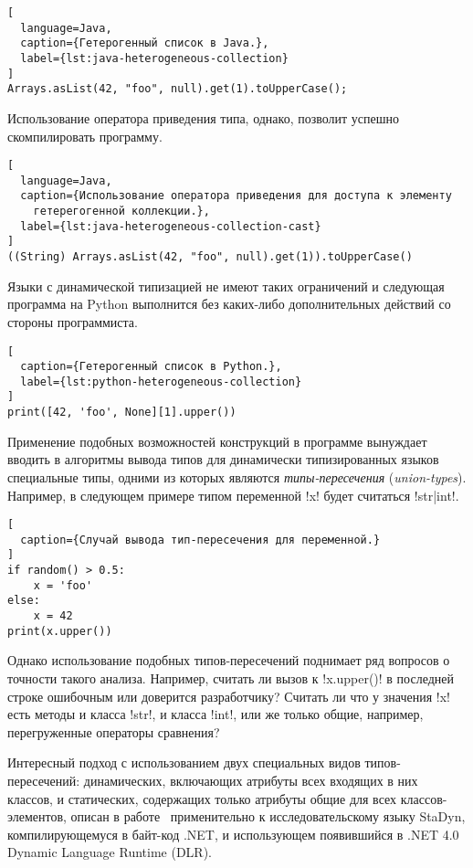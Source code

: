 \begin{lstlisting}[
  language=Java,
  caption={Гетерогенный список в Java.},
  label={lst:java-heterogeneous-collection}
]
Arrays.asList(42, "foo", null).get(1).toUpperCase();
\end{lstlisting}

Использование оператора приведения типа, однако, позволит успешно скомпилировать
программу.

\begin{lstlisting}[
  language=Java,
  caption={Использование оператора приведения для доступа к элементу
    гетерегогенной коллекции.},
  label={lst:java-heterogeneous-collection-cast}
]
((String) Arrays.asList(42, "foo", null).get(1)).toUpperCase()
\end{lstlisting}

Языки с динамической типизацией не имеют таких ограничений и следующая программа
на Python выполнится без каких-либо дополнительных действий со стороны
программиста.

\begin{lstlisting}[
  caption={Гетерогенный список в Python.},
  label={lst:python-heterogeneous-collection}
]
print([42, 'foo', None][1].upper())
\end{lstlisting}

Применение подобных возможностей конструкций в программе вынуждает вводить в
алгоритмы вывода типов для динамически типизированных языков специальные типы,
одними из которых являются \emph{типы-пересечения} (\emph{union-types}).
Например, в следующем примере типом переменной !x! будет считаться !str|int!.

\begin{lstlisting}[
  caption={Случай вывода тип-пересечения для переменной.}
]
if random() > 0.5:
    x = 'foo'
else:
    x = 42
print(x.upper())
\end{lstlisting}

Однако использование подобных типов-пересечений поднимает ряд вопросов о
точности такого анализа. Например, считать ли вызов к !x.upper()! в последней
строке ошибочным или доверится разработчику? Считать ли что у значения !x! есть
методы и класса !str!, и класса !int!, или же только общие, например,
перегруженные операторы сравнения?

Интересный подход с использованием двух специальных видов типов-пересечений:
динамических, включающих атрибуты всех входящих в них классов, и статических,
содержащих только атрибуты общие для всех классов-элементов, описан в
работе~\cite{Ortin2011:union} применительно к исследовательскому языку StaDyn,
компилирующемуся в байт-код .NET, и использующем появившийся в .NET 4.0 Dynamic
Language Runtime (DLR).

